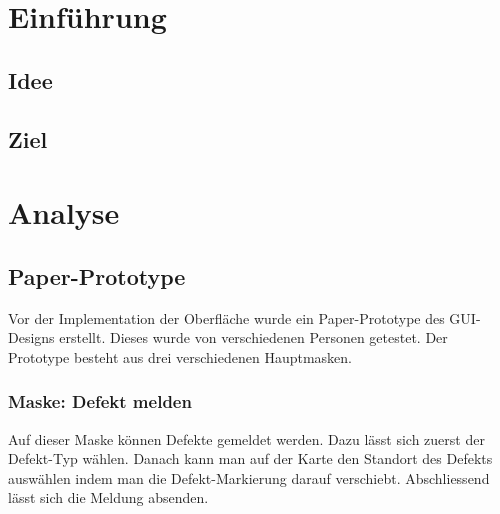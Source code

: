 \section{Einführung}
\subsection{Idee}


\subsection{Ziel}


\section{Analyse}

\subsection{Paper-Prototype}
Vor der Implementation der Oberfläche wurde ein Paper-Prototype des GUI-Designs erstellt. Dieses wurde von verschiedenen Personen getestet. Der Prototype besteht aus drei verschiedenen Hauptmasken.

\subsubsection{Maske: Defekt melden}
Auf dieser Maske können Defekte gemeldet werden. Dazu lässt sich zuerst der Defekt-Typ wählen. Danach kann man auf der Karte den Standort des Defekts auswählen indem man die Defekt-Markierung darauf verschiebt. Abschliessend lässt sich die Meldung absenden.

\begin{figure}[H]
\hfill
{}
\end{figure}